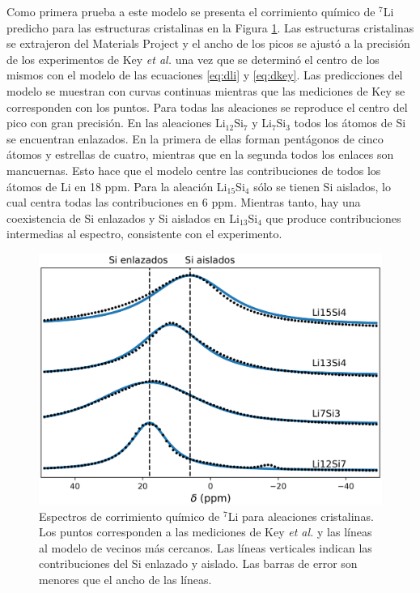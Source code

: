 Como primera prueba a este modelo se presenta el corrimiento químico de $^7$Li 
predicho para las estructuras cristalinas en la Figura \ref{fig:c-nmr}. 
Las estructuras cristalinas se extrajeron del Materials Project 
\cite{materials_project} y el ancho de los picos se ajustó a la precisión de los 
experimentos de Key \textit{et al.} \cite{key2009} una vez que se determinó el 
centro de los mismos con el modelo de las ecuaciones \ref{eq:dli} y \ref{eq:dkey}.
Las predicciones del modelo se muestran con curvas continuas mientras que las 
mediciones de Key se corresponden con los puntos. Para todas las aleaciones se 
reproduce el centro del pico con gran precisión. En las aleaciones 
Li$_{12}$Si$_7$ y Li$_7$Si$_3$ todos los átomos de Si se encuentran enlazados. 
En la primera de ellas forman pentágonos de cinco átomos y estrellas de cuatro, 
mientras que en la segunda todos los enlaces son mancuernas. Esto hace que el 
modelo centre las contribuciones de todos los átomos de Li en 18 ppm. Para 
la aleación Li$_{15}$Si$_4$ sólo se tienen Si aislados, lo cual centra todas las
contribuciones en 6 ppm. Mientras tanto, hay una coexistencia de Si enlazados y 
Si aislados en Li$_{13}$Si$_4$ que produce contribuciones intermedias al espectro,
consistente con el experimento.
\begin{figure}[h!]
    \centering
    \includegraphics[width=.7\textwidth]{Silicio/prediccion/resultados/nmr/c-nmr.png}
    \caption{Espectros de corrimiento químico de $^7$Li para aleaciones 
    cristalinas. Los puntos corresponden a las mediciones de Key \textit{et al.}
    y las líneas al modelo de vecinos más cercanos. Las líneas verticales indican las 
    contribuciones del Si enlazado y aislado. Las barras de error son menores que
    el ancho de las líneas.}
    \label{fig:c-nmr}
\end{figure}

